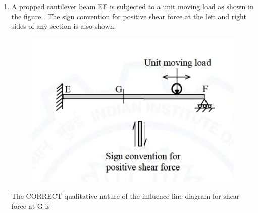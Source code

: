 \documentclass[journal,12pt,onecolumn]{article}
\theoremstyle{remark}
\begin{document}
\begin{enumerate}
\item A propped cantilever beam EF is subjected to a unit moving load as shown in the figure  . The sign convention for positive shear force at the left and right sides of any section is also shown.
\begin{figure}[H]
    \centering
    \includegraphics[width=0.7\columnwidth]{figs/1q4.jpg}
    \caption{}
    \label{fig:q4}
\end{figure}
The CORRECT qualitative nature of the influence line diagram for shear force at G is


\end{enumerate}
\end{document}
